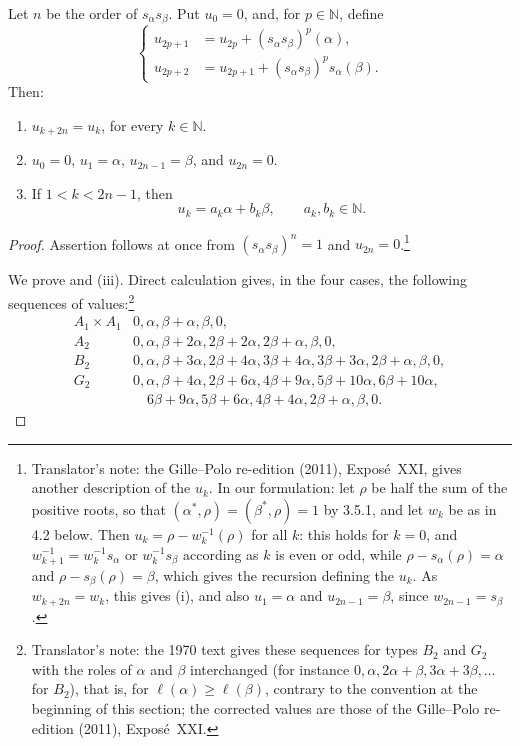 \begin{proposition}\label{sga3:XXI:4.1}
Let \(n\) be the order of \(s_\alpha s_\beta\). Put \(u_0=0\), and,
for \(p\in\mathbb N\), define
\[
\left\{
\begin{aligned}
u_{2p+1}&=u_{2p}+(s_\alpha s_\beta)^p(\alpha),\\
u_{2p+2}&=u_{2p+1}+(s_\alpha s_\beta)^p s_\alpha(\beta).
\end{aligned}
\right.
\]
Then:
\begin{enumerate}
\item[\SGAInlineRefTarget{sga3:XXI:4.1:item:i}(i)] \(u_{k+2n}=u_k\), for every \(k\in\mathbb N\).
\item[\SGAInlineRefTarget{sga3:XXI:4.1:item:ii}(ii)] \(u_0=0\), \(u_1=\alpha\), \(u_{2n-1}=\beta\),
and \(u_{2n}=0\).
\item[(iii)] If \(1<k<2n-1\), then
\[
 u_k=a_k\alpha+b_k\beta,
 \qquad a_k,b_k\in\mathbb N.
\]
\end{enumerate}
\end{proposition}

\begin{proof}
Assertion  follows at once from \((s_\alpha s_\beta)^n=1\) and
\(u_{2n}=0\).\footnote{Translator's note: the Gille--Polo re-edition (2011), Exposé~XXI, gives another description of the \(u_k\). In
our formulation: let \(\rho\) be half the sum of the positive roots, so that
\((\alpha^\ast,\rho)=(\beta^\ast,\rho)=1\) by 3.5.1, and let \(w_k\) be as in 4.2 below.
Then \(u_k=\rho-w_k^{-1}(\rho)\) for all \(k\): this holds for \(k=0\), and
\(w_{k+1}^{-1}=w_k^{-1}s_\alpha\) or \(w_k^{-1}s_\beta\) according as \(k\) is even or
odd, while \(\rho-s_\alpha(\rho)=\alpha\) and \(\rho-s_\beta(\rho)=\beta\), which gives
the recursion defining the \(u_k\). As \(w_{k+2n}=w_k\), this gives (i), and also
\(u_1=\alpha\) and \(u_{2n-1}=\beta\), since \(w_{2n-1}=s_\beta\).}

We prove  and (iii). Direct calculation gives, in the four cases,
the following sequences of values:\footnote{Translator's note: the 1970 text gives
these sequences for types \(B_2\) and \(G_2\) with the roles of \(\alpha\) and \(\beta\)
interchanged (for instance \(0,\alpha,2\alpha+\beta,3\alpha+3\beta,\ldots\) for \(B_2\)),
that is, for \(\ell(\alpha)\geq\ell(\beta)\), contrary to the convention at the beginning
of this section; the corrected values are those of the Gille--Polo re-edition (2011),
Exposé~XXI.}
\[
\begin{array}{c|l}
A_1\times A_1&0,\alpha,\beta+\alpha,\beta,0,\\[2pt]
A_2&0,\alpha,\beta+2\alpha,2\beta+2\alpha,
       2\beta+\alpha,\beta,0,\\[2pt]
B_2&0,\alpha,\beta+3\alpha,2\beta+4\alpha,
       3\beta+4\alpha,3\beta+3\alpha,2\beta+\alpha,\beta,0,\\[2pt]
G_2&0,\alpha,\beta+4\alpha,2\beta+6\alpha,
       4\beta+9\alpha,5\beta+10\alpha,6\beta+10\alpha,\\
   &\quad 6\beta+9\alpha,5\beta+6\alpha,4\beta+4\alpha,
       2\beta+\alpha,\beta,0.
\end{array}
\]
\end{proof}


